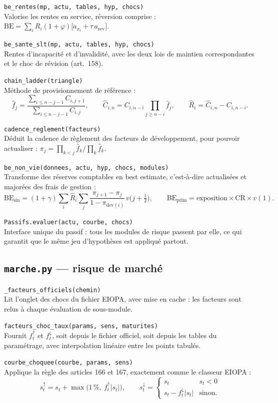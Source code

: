 \documentclass[10pt,a4paper]{article}
\newcommand{\fn}[2]{\par\smallskip\textcolor{bleufonce}{\texttt{#1}}\\ #2\par}
\newcommand{\art}[1]{\textcolor{gris}{\small (art.~#1)}}
\begin{document}
\fn{be\_rentes(mp, actu, tables, hyp, chocs)}{Valorise les rentes en service, réversion comprise :
$\mathrm{BE} = \sum_i R_i (1+\varphi)\bigl[\ddot a_{x_i} + \tau\, a_{\text{rev}}\bigr]$.}

\fn{be\_sante\_slt(mp, actu, tables, hyp, chocs)}{Rentes d'incapacité et d'invalidité, avec les
deux lois de maintien correspondantes et le choc de révision \art{158}.}

\fn{chain\_ladder(triangle)}{Méthode de provisionnement de référence :
\[
\hat f_j = \frac{\sum_{i \le n-j-1} C_{i,j+1}}{\sum_{i \le n-j-1} C_{i,j}},
\qquad
\hat C_{i,n} = C_{i,n-i}\prod_{j \ge n-i} \hat f_j,
\qquad
\hat R_i = \hat C_{i,n} - C_{i,n-i}.
\]}

\fn{cadence\_reglement(facteurs)}{Déduit la cadence de règlement des facteurs de développement,
pour pouvoir actualiser : $\pi_j = \prod_{k<j} \hat f_k / \prod_{k} \hat f_k$.}

\fn{be\_non\_vie(donnees, actu, hyp, chocs, modules)}{Transforme des réserves comptables en best
estimate, c'est-à-dire actualisées et majorées des frais de gestion :
\[
\mathrm{BE}_{\text{sin}} = (1+\gamma)\sum_i \hat R_i \sum_j \frac{\pi_{j+1}-\pi_j}{1-\pi_{\text{dev}(i)}}\,
v\bigl(j+\tfrac12\bigr),
\qquad
\mathrm{BE}_{\text{prim}} = \text{exposition} \times \mathrm{CR} \times v(1).
\]}

\fn{Passifs.evaluer(actu, courbe, chocs)}{Interface unique du passif : tous les modules de risque
passent par elle, ce qui garantit que le même jeu d'hypothèses est appliqué partout.}

\subsection{\texttt{marche.py} — risque de marché}

\fn{\_facteurs\_officiels(chemin)}{Lit l'onglet des chocs du fichier EIOPA, avec mise en cache :
les facteurs sont relus à chaque évaluation de sous-module.}

\fn{facteurs\_choc\_taux(params, sens, maturites)}{Fournit $f^{\uparrow}_t$ et $f^{\downarrow}_t$,
soit depuis le fichier officiel, soit depuis les tables du paramétrage, avec interpolation
linéaire entre les points tabulés.}

\fn{courbe\_choquee(courbe, params, sens)}{Applique la règle des articles 166 et 167, exactement
comme le classeur EIOPA :
\[
s^{\uparrow}_t = s_t + \max\bigl(1\,\%,\ f^{\uparrow}_t |s_t|\bigr),
\qquad
s^{\downarrow}_t = \begin{cases} s_t & s_t < 0\\ s_t - f^{\downarrow}_t |s_t| & \text{sinon.}\end{cases}
\]}
\end{document}
